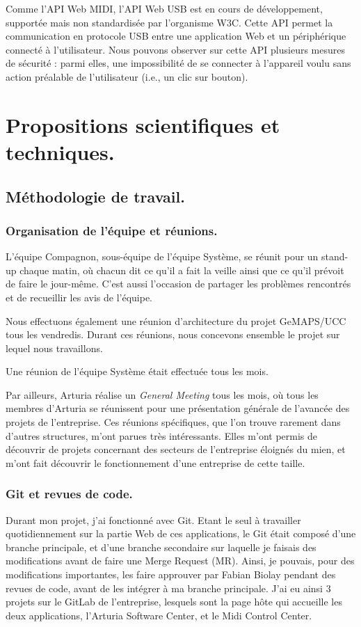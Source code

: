 \documentclass[francais]{rapportPFE}  %
\begin{document}
Comme l'API Web MIDI, l'API Web USB \cite{webusb1}
est en cours de développement, supportée mais non standardisée par l'organisme W3C. Cette API permet la communication en protocole USB entre une application Web et un périphérique connecté à l'utilisateur.
Nous pouvons observer sur cette API plusieurs mesures de sécurité \cite{webusb2}
 : parmi elles, une impossibilité de se connecter à l'appareil voulu sans action préalable de l'utilisateur (i.e., un clic sur bouton).


\section{Propositions scientifiques et techniques.}
\subsection{Méthodologie de travail.}
\subsubsection{Organisation de l'équipe et réunions.}
L'équipe Compagnon, sous-équipe de l'équipe Système, se réunit pour un stand-up chaque matin, où chacun dit ce qu'il a fait la veille ainsi que ce qu'il prévoit de faire le jour-même. C'est aussi l'occasion de partager les problèmes rencontrés et de recueillir les avis de l'équipe.

Nous effectuons également une réunion d'architecture du projet GeMAPS/UCC tous les vendredis. Durant ces réunions, nous concevons ensemble le projet sur lequel nous travaillons. 

Une réunion de l'équipe Système était effectuée tous les mois.

Par ailleurs, Arturia réalise un \textit{General Meeting} tous les mois, où tous les membres d'Arturia se réunissent pour une présentation générale de l'avancée des projets de l'entreprise. Ces réunions spécifiques, que l'on trouve rarement dans d'autres structures, m'ont parues très intéressants. Elles m'ont permis de découvrir de projets concernant des secteurs de l'entreprise éloignés du mien, et m'ont fait découvrir le fonctionnement d'une entreprise de cette taille.


\subsubsection{Git et revues de code.}
Durant mon projet, j'ai fonctionné avec Git. Etant le seul à travailler quotidiennement sur la partie Web de ces applications, le Git était composé d'une branche principale, et d'une branche secondaire sur laquelle je faisais des modifications avant de faire une Merge Request (MR). Ainsi, je pouvais, pour des modifications importantes, les faire approuver par Fabian Biolay pendant des revues de code, avant de les intégrer à ma branche principale. J'ai eu ainsi 3 projets sur le GitLab de l'entreprise, lesquels sont la page hôte qui accueille les deux applications, l'Arturia Software Center, et le Midi Control Center.
\end{document}
